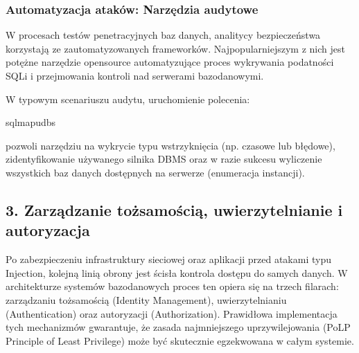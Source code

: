 \documentclass[a4paper,11pt,english,openany,oneside]{sphinxmanual}
\begin{document}
\subsubsection{Automatyzacja ataków: Narzędzia audytowe}
\label{\detokenize{rozdzial_2/rozdzial_27/rozdzial_2:automatyzacja-atakow-narzedzia-audytowe}}
\sphinxAtStartPar
W procesach testów penetracyjnych baz danych, analitycy bezpieczeństwa korzystają ze zautomatyzowanych frameworków. Najpopularniejszym z nich jest  \textendash{} potężne narzędzie open\sphinxhyphen{}source automatyzujące proces wykrywania podatności SQLi i przejmowania kontroli nad serwerami bazodanowymi.

\sphinxAtStartPar
W typowym scenariuszu audytu, uruchomienie polecenia:

\begin{sphinxVerbatim}[commandchars=\\\{\}]
sqlmap\PYGZhy{}u\PYGZhy{}\PYGZhy{}dbs
\end{sphinxVerbatim}

\sphinxAtStartPar
pozwoli narzędziu na wykrycie typu wstrzyknięcia (np. czasowe lub błędowe), zidentyfikowanie używanego silnika DBMS oraz \textendash{} w razie sukcesu \textendash{} wyliczenie wszystkich baz danych dostępnych na serwerze (enumeracja instancji).

\sphinxstepscope


\subsection{3. Zarządzanie tożsamością, uwierzytelnianie i autoryzacja}
\label{\detokenize{rozdzial_2/rozdzial_27/rozdzial_3:zarzadzanie-tozsamoscia-uwierzytelnianie-i-autoryzacja}}\label{\detokenize{rozdzial_2/rozdzial_27/rozdzial_3::doc}}
\sphinxAtStartPar
Po zabezpieczeniu infrastruktury sieciowej oraz aplikacji przed atakami typu Injection, kolejną linią obrony jest ścisła kontrola dostępu do samych danych. W architekturze systemów bazodanowych proces ten opiera się na trzech filarach: zarządzaniu tożsamością (Identity Management), uwierzytelnianiu (Authentication) oraz autoryzacji (Authorization). Prawidłowa implementacja tych mechanizmów gwarantuje, że zasada najmniejszego uprzywilejowania (PoLP \sphinxhyphen{} Principle of Least Privilege) może być skutecznie egzekwowana w całym systemie.
\end{document}
